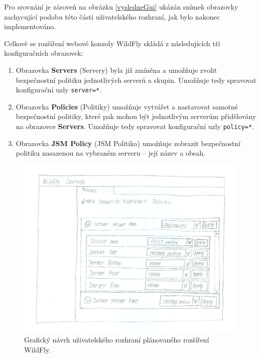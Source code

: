 Pro srovnání je zároveň na obrázku \ref{vysledneGui} ukázán snímek obrazovky zachycující podobu této části uživatelského rozhraní, jak bylo nakonec implementováno.

Celkově se rozšíření webové konzoly WildFly skládá z následujících tří konfiguračních obrazovek:

\begin{enumerate}
  
  \item Obrazovka {\bf Servers} (Servery) byla již zmíněna a umožňuje zvolit bezpečnostní politiku jednotlivých serverů a skupin. Umožňuje tedy spravovat konfigurační uzly {\tt server=*}.
  
  \item Obrazovka {\bf Policies} (Politiky) umožňuje vytvářet a nastavovat samotné bezpečnostní politiky, které pak mohou být jednotlivým serverům přidělovány na obrazovce {\bf Servers}. Umožňuje tedy spravovat konfigurační uzly {\tt policy=*}.
  
  \item Obrazovka {\bf JSM Policy} (JSM Politika) umožňuje zobrazit bezpečnostní politiku nasazenou na vybraném serveru -- její název a obsah.
  
\end{enumerate}

\begin{figure}[ht]
  \centering
  \includegraphics[width=14cm]{fig/mockup}
  \caption{Grafický návrh uživatelského rozhraní plánovaného rozšíření WildFly.}
  \label{navrhGui}
\end{figure}

